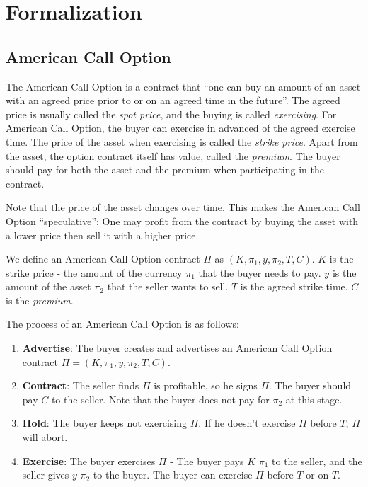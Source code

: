 \section{Formalization}
\label{sec:formalization}

\subsection{American Call Option}

The American Call Option is a contract that ``one can buy an amount of an asset with an agreed price prior to or on an agreed time in the future''.
The agreed price is usually called the \textit{spot price}, and the buying is called \textit{exercising}.
For American Call Option, the buyer can exercise in advanced of the agreed exercise time.
The price of the asset when exercising is called the \textit{strike price}.
Apart from the asset, the option contract itself has value, called the \textit{premium}.
The buyer should pay for both the asset and the premium when participating in the contract.

Note that the price of the asset changes over time. This makes the American Call Option ``speculative'': One may profit from the contract by buying the asset with a lower price then sell it with a higher price.

\begin{definition}
We define an American Call Option contract $\Pi$ as $(K, \pi_1, y, \pi_2, T, C)$.
$K$ is the strike price - the amount of the currency $\pi_1$ that the buyer needs to pay.
$y$ is the amount of the asset $\pi_2$ that the seller wants to sell.
$T$ is the agreed strike time.
$C$ is the \textit{premium}.
\end{definition}

The process of an American Call Option is as follows:

\begin{enumerate}
    \item \textbf{Advertise}: The buyer creates and advertises an American Call Option contract $\Pi = (K, \pi_1, y, \pi_2, T, C)$.
    \item \textbf{Contract}: The seller finds $\Pi$ is profitable, so he signs $\Pi$.
    The buyer should pay $C$ to the seller.
    Note that the buyer does not pay for $\pi_2$ at this stage.
    \item \textbf{Hold}: The buyer keeps not exercising $\Pi$. If he doesn't exercise $\Pi$ before $T$, $\Pi$ will abort.
    \item \textbf{Exercise}: The buyer exercises $\Pi$ - The buyer pays $K$ $\pi_1$ to the seller, and the seller gives $y$ $\pi_2$ to the buyer. The buyer can exercise $\Pi$ before $T$ or on $T$.
\end{enumerate}

